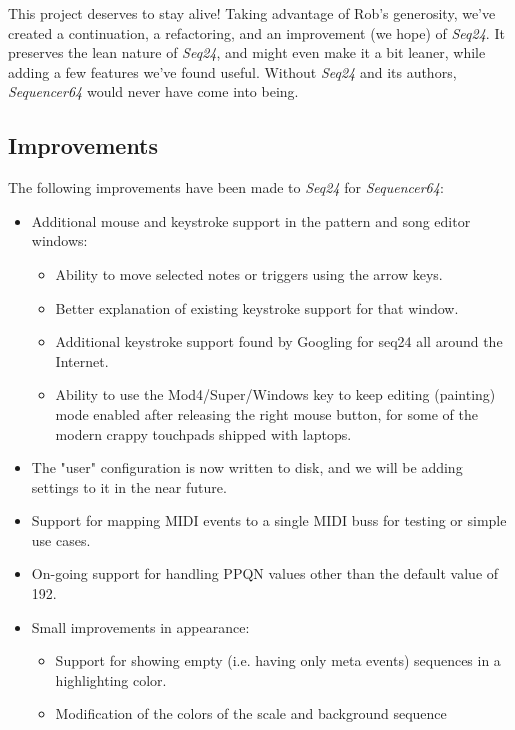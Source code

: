 \documentclass[
 11pt,
 twoside,
 a4paper,
 headinclude,
 footinclude,
 final                                 %
]{article}
\begin{document}
   This project deserves to stay alive!  Taking advantage of Rob's generosity,
   we've created a continuation, a refactoring, and an improvement (we hope) of
   \textsl{Seq24}.  It preserves the lean nature of \textsl{Seq24}, and might
   even make it a bit leaner, while adding a few features we've found useful.
   Without \textsl{Seq24} and its authors, \textsl{Sequencer64} would never
   have come into being.

\subsection{Improvements}
\label{subsec:improvements}

   The following improvements have been made to \textsl{Seq24} for
   \textsl{Sequencer64}:

   \begin{itemize}
      \item Additional mouse and keystroke support in the pattern and song
         editor windows:
      \begin{itemize}
         \item Ability to move selected notes or triggers using the arrow keys.
         \item Better explanation of existing keystroke support for that window.
         \item Additional keystroke support found by Googling for seq24 all
            around the Internet.
         \item Ability to use the Mod4/Super/Windows key to keep editing
            (painting) mode enabled after releasing the right mouse button,
            for some of the modern crappy touchpads shipped with
            laptops.
      \end{itemize}
      \item The "user" configuration is now written to disk, and we will be
         adding settings to it in the near future.
      \item Support for mapping MIDI events to a single MIDI buss for testing
         or simple use cases.
      \item On-going support for handling PPQN values other than the
         default value of 192.
      \item Small improvements in appearance:
      \begin{itemize}
         \item Support for showing empty (i.e. having only meta events)
            sequences in a highlighting color.
         \item Modification of the colors of the scale and background sequence

\end{itemize}
\end{itemize}
\end{document}

